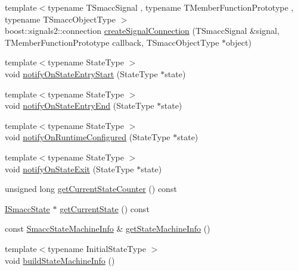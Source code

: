 \begin{DoxyCompactItemize}
\item 
{\footnotesize template$<$typename T\+Smacc\+Signal , typename T\+Member\+Function\+Prototype , typename T\+Smacc\+Object\+Type $>$ }\\boost\+::signals2\+::connection \hyperlink{classsmacc_1_1ISmaccStateMachine_adf0f42ade0c65cc471960fe2a7c42da2}{create\+Signal\+Connection} (T\+Smacc\+Signal \&signal, T\+Member\+Function\+Prototype callback, T\+Smacc\+Object\+Type $\ast$object)
\item 
{\footnotesize template$<$typename State\+Type $>$ }\\void \hyperlink{classsmacc_1_1ISmaccStateMachine_aeec54e997d715b105ebfeb5caadc4fbf}{notify\+On\+State\+Entry\+Start} (State\+Type $\ast$state)
\item 
{\footnotesize template$<$typename State\+Type $>$ }\\void \hyperlink{classsmacc_1_1ISmaccStateMachine_a856cf2d25d84659b974cccfbf44aeec9}{notify\+On\+State\+Entry\+End} (State\+Type $\ast$state)
\item 
{\footnotesize template$<$typename State\+Type $>$ }\\void \hyperlink{classsmacc_1_1ISmaccStateMachine_a7377ca0f79289fdc27f9ed3ff6e67263}{notify\+On\+Runtime\+Configured} (State\+Type $\ast$state)
\item 
{\footnotesize template$<$typename State\+Type $>$ }\\void \hyperlink{classsmacc_1_1ISmaccStateMachine_a9d2bd4aca0c80a1ec22c5f95e7c38db8}{notify\+On\+State\+Exit} (State\+Type $\ast$state)
\item 
unsigned long \hyperlink{classsmacc_1_1ISmaccStateMachine_a03966e531cefc1e096bffa46111871d2}{get\+Current\+State\+Counter} () const 
\item 
\hyperlink{classsmacc_1_1ISmaccState}{I\+Smacc\+State} $\ast$ \hyperlink{classsmacc_1_1ISmaccStateMachine_ad150bf5c87f3c8f3cadd716e571d858e}{get\+Current\+State} () const 
\item 
const \hyperlink{classsmacc_1_1introspection_1_1SmaccStateMachineInfo}{Smacc\+State\+Machine\+Info} \& \hyperlink{classsmacc_1_1ISmaccStateMachine_a3b1facb0477325fe43b447fc21d9eb7d}{get\+State\+Machine\+Info} ()
\item 
{\footnotesize template$<$typename Initial\+State\+Type $>$ }\\void \hyperlink{classsmacc_1_1ISmaccStateMachine_a8e9c16ed0dc3dfc878548a8c6f3c47d7}{build\+State\+Machine\+Info} ()
\end{DoxyCompactItemize}
